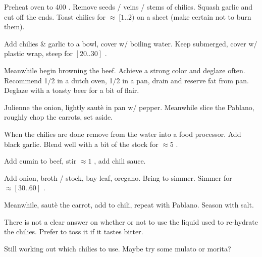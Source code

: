 \begin{preparation}
\item Preheat oven to 400 \Fahrenheit.
	Remove seeds / veins / stems of chilies.
	Squash garlic and cut off the ends.
	Toast chilies for $\approx~[1..2)$ on a sheet (make certain not to burn them).

\item Add chilies \& garlic to a bowl, cover w/ boiling water.
	Keep submerged, cover w/ plastic wrap, steep for $[20..30]$ \minute.

\item Meanwhile begin browning the beef.
	Achieve a strong color and deglaze often.
	Recommend 1/2 in a dutch oven, 1/2 in a pan, drain and reserve fat from pan.
	Deglaze with a toasty beer for a bit of flair.

\item Julienne the onion, lightly saut\`{e} in pan w/ pepper.
	Meanwhile slice the Pablano, roughly chop the carrots, set aside.

\item When the chilies are done remove from the water into a food processor.
	Add black garlic.
	Blend well with a bit of the stock for $\approx5$ \minute.

\item Add cumin to beef, stir $\approx 1$ \minute, add chili sauce.

\item Add onion, broth / stock, bay leaf, oregano.
	Bring to simmer.
	Simmer for $\approx[30..60]$ \minute.

\item Meanwhile, saut\`{e} the carrot, add to chili, repeat with Pablano.
	Season with salt.
\end{preparation}


\begin{variation}
\item There is not a clear answer on whether or not to use the liquid used to re-hydrate the chilies.
	Prefer to toss it if it tastes bitter.
\end{variation}


\begin{experiments}
\item Still working out which chilies to use.
	Maybe try some mulato or morita?
\end{experiments}


\recipeend

